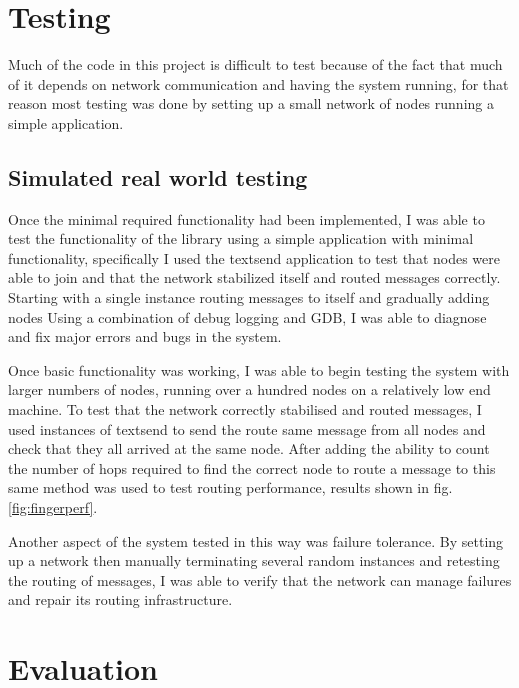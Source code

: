 \documentclass{article}
\begin{document}
\section{Testing}

Much of the code in this project is difficult to test because of the fact that much of it depends on network communication and having the system running, for that reason most testing was done by setting up a small network of nodes running a simple application.

\subsection{Simulated real world testing}

Once the minimal required functionality had been implemented, I was able to test the functionality of the library using a simple application with minimal functionality, specifically I used the textsend application to test that nodes were able to join and that the network stabilized itself and routed messages correctly. Starting with a single instance routing messages to itself and gradually adding nodes Using a combination of debug logging and GDB, I was able to diagnose and fix major errors and bugs in the system.

Once basic functionality was working, I was able to begin testing the system with larger numbers of nodes, running over a hundred nodes on a relatively low end machine. To test that the network correctly stabilised and routed messages, I used instances of textsend to send the route same message from all nodes and check that they all arrived at the same node. After adding the ability to count the number of hops required to find the correct node to route a message to this same method was used to test routing performance, results shown in fig. \ref{fig:fingerperf}.

Another aspect of the system tested in this way was failure tolerance. By setting up a network then manually terminating several random instances and retesting the routing of messages, I was able to verify that the network can manage failures and repair its routing infrastructure.

\section{Evaluation}

\end{document}
